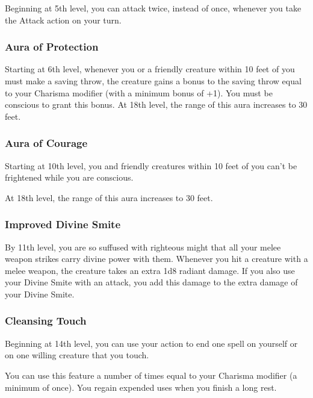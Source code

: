 \documentclass[
]{article}
\begin{document}
Beginning at 5th level, you can attack twice, instead of once, whenever
you take the Attack action on your turn.

\hypertarget{aura-of-protection}{%
\subsubsection{Aura of Protection}\label{aura-of-protection}}

Starting at 6th level, whenever you or a friendly creature within 10
feet of you must make a saving throw, the creature gains a bonus to the
saving throw equal to your Charisma modifier (with a minimum bonus of
+1). You must be conscious to grant this bonus. At 18th level, the range
of this aura increases to 30 feet.

\hypertarget{aura-of-courage}{%
\subsubsection{Aura of Courage}\label{aura-of-courage}}

Starting at 10th level, you and friendly creatures within 10 feet of you
can't be frightened while you are conscious.

At 18th level, the range of this aura increases to 30 feet.

\hypertarget{improved-divine-smite}{%
\subsubsection{Improved Divine Smite}\label{improved-divine-smite}}

By 11th level, you are so suffused with righteous might that all your
melee weapon strikes carry divine power with them. Whenever you hit a
creature with a melee weapon, the creature takes an extra 1d8 radiant
damage. If you also use your Divine Smite with an attack, you add this
damage to the extra damage of your Divine Smite.

\hypertarget{cleansing-touch}{%
\subsubsection{Cleansing Touch}\label{cleansing-touch}}

Beginning at 14th level, you can use your action to end one spell on
yourself or on one willing creature that you touch.

You can use this feature a number of times equal to your Charisma
modifier (a minimum of once). You regain expended uses when you finish a
long rest.
\end{document}
